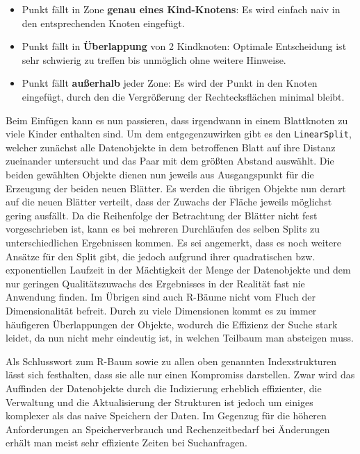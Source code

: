 \begin{itemize}
	\item Punkt fällt in Zone \textbf{genau eines Kind-Knotens}: Es wird einfach naiv
		in den entsprechenden Knoten eingefügt.
	\item Punkt fällt in \textbf{Überlappung} von 2 Kindknoten: Optimale Entscheidung ist
		sehr schwierig zu treffen bis unmöglich ohne weitere Hinweise.
	\item Punkt fällt \textbf{außerhalb} jeder Zone: Es wird der Punkt in den Knoten
		eingefügt, durch den die Vergrößerung der Rechtecksflächen minimal
		bleibt.
\end{itemize}

Beim Einfügen kann es nun passieren, dass irgendwann in einem Blattknoten zu
viele Kinder enthalten sind. Um dem entgegenzuwirken gibt es den
\texttt{LinearSplit}, welcher zunächst alle Datenobjekte in dem betroffenen Blatt
auf ihre Distanz zueinander untersucht und das Paar mit dem größten Abstand
auswählt. Die beiden gewählten Objekte dienen nun jeweils aus Ausgangspunkt für
die Erzeugung der beiden neuen Blätter. Es werden die übrigen Objekte nun derart
auf die neuen Blätter verteilt, dass der Zuwachs der Fläche jeweils möglichst gering
ausfällt. Da die Reihenfolge der Betrachtung der Blätter nicht fest vorgeschrieben
ist, kann es bei mehreren Durchläufen des selben Splits zu unterschiedlichen
Ergebnissen kommen.  Es sei angemerkt, dass es noch weitere Ansätze für den
Split gibt, die jedoch aufgrund ihrer quadratischen bzw. exponentiellen Laufzeit
in der Mächtigkeit der Menge der Datenobjekte und dem nur geringen Qualitätszuwachs
des Ergebnisses in der Realität fast nie Anwendung finden. 
Im Übrigen sind auch R-Bäume nicht vom Fluch der Dimensionalität befreit. Durch
zu viele Dimensionen kommt es zu immer häufigeren Überlappungen der Objekte,
wodurch die Effizienz der Suche stark leidet, da nun nicht mehr eindeutig ist,
in welchen Teilbaum man absteigen muss.

Als Schlusswort zum R-Baum sowie zu allen oben genannten Indexstrukturen lässt
sich festhalten, dass sie alle nur einen Kompromiss darstellen. Zwar wird das
Auffinden der Datenobjekte durch die Indizierung erheblich effizienter, die
Verwaltung und die Aktualisierung der Strukturen ist jedoch um einiges komplexer
als das naive Speichern der Daten. Im Gegenzug für die höheren Anforderungen an
Speicherverbrauch und Rechenzeitbedarf bei Änderungen erhält man meist sehr effiziente
Zeiten bei Suchanfragen.


